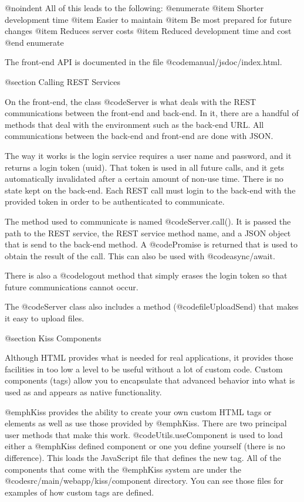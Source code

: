 @noindent
All of this leads to the following:
@enumerate
@item
Shorter development time
@item 
Easier to maintain
@item
Be most prepared for future changes
@item
Reduces server costs
@item
Reduced development time and cost
@end enumerate

The front-end API is documented in the file @code{manual/jsdoc/index.html}.



@section Calling REST Services

On the front-end, the class @code{Server} is what deals with the REST
communications between the front-end and back-end.  In it, there are a
handful of methods that deal with the environment such as the back-end
URL.  All communications between the back-end and front-end are done
with JSON.

The way it works is the login service requires a user name and
password, and it returns a login token (uuid).  That token is used in
all future calls, and it gets automatically invalidated after a certain
amount of non-use time.  There is no state kept on the back-end.  Each
REST call must login to the back-end with the provided token in order
to be authenticated to communicate.

The method used to communicate is named @code{Server.call()}. It is passed the
path to the REST service, the REST service method name, and a JSON
object that is send to the back-end method.  A @code{Promise} is
returned that is used to obtain the result of the call.  This
can also be used with @code{async/await}.

There is also a @code{logout} method that simply erases the
login token so that future communications cannot occur.

The @code{Server} class also includes a method (@code{fileUploadSend})
that makes it easy to upload files.

@section Kiss Components


Although HTML provides what is needed for real applications, it
provides those facilities in too low a level to be useful without a
lot of custom code.  Custom components (tags) allow you to encapsulate
that advanced behavior into what is used as and appears as native
functionality.

@emph{Kiss} provides the ability to create your own custom HTML tags
or elements as well as use those provided by @emph{Kiss}.  There are
two principal user methods that make this work.
@code{Utils.useComponent} is used to load either a @emph{Kiss} defined
component or one you define yourself (there is no difference).  This
loads the JavaScript file that defines the new tag.  All of the
components that come with the @emph{Kiss} system are under the
@code{src/main/webapp/kiss/component} directory.  You can see those
files for examples of how custom tags are defined.

